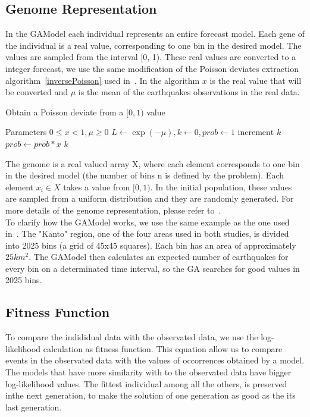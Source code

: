 \subsection{Genome Representation}
In the GAModel each individual represents an entire forecast model. Each gene of the individual is a real value, corresponding to one bin in the desired model. The values are sampled from the interval [0, 1). These real values are converted to a integer forecast, we use the same modification of the Poisson deviates extraction algorithm~\ref{inversePoisson} used in~\cite{ecta14}. In the algorithm $x$ is the real value that will be converted and $\mu$ is the mean of the earthquakes observations in the real data. \\

\begin{algorithm}\label{inversePoisson}
  \caption{Obtain a Poisson deviate from a $[0,1)$ value}
  \label{InversePoisson}
  \begin{algorithmic}
    \STATE Parameters $0 \leq x < 1, \mu \geq 0$
    \STATE $L \gets \exp{(-\mu)}, k \gets 0, prob \gets 1$
    \REPEAT 
    \STATE $\text{increment }k$
    \STATE $prob \gets prob*x$
    \RETURN $k$
  \end{algorithmic}
\end{algorithm}

The genome is a real valued array X, where each element corresponds to one bin in the desired model (the number of bins n is defined by the problem). Each element $x_i \in X$ takes a value from $[0,1)$. In the initial population, these values are sampled from a uniform distribution and they are randomly generated. For more details of the genome representation, please refer to~\cite{ecta14}.\\


To clarify how the GAModel works, we use the same example as the one used in~\cite{ecta14}. The "Kanto" region, one of the four areas used in both studies, is divided into 2025 bins (a grid of 45x45 squares). Each bin has an area of approximately $25km^2$. The GAModel then calculates an expected number of earthquakes for every bin on a determinated time interval, so the GA searches for good values in 2025 bins.\\
\subsection{Fitness Function}\label{fitGA}

To compare the indididual data with the observated data, we use the log-likelihood calculation as fitness function. This equation allow us to compare events in the observated data with the values of occorrences obtained by a model. The models that have more similarity with to the observated data have bigger log-likelihood values. The fittest individual among all the others, is preserved inthe next generation, to make the solution of one generation as good as the its last generation.\\

